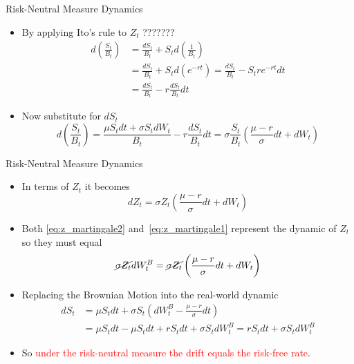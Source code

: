 \documentclass{beamer}
\begin{document}
\begin{frame}{Risk-Neutral Measure Dynamics}
\begin{itemize}
	\item By applying Ito's rule to $Z_t$ ???????
	\begin{equation*}
		\begin{aligned}
		d\left(\frac{S_t}{B_t}\right) &= \frac{dS_t}{B_t} + S_t d\left(\frac{1}{B_t}\right) \\ 
		&=\frac{dS_t}{B_t} + S_t d\left(e^{-rt}\right) = \frac{dS_t}{B_t} - S_t re^{-rt}dt \\
		&= \frac{dS_t}{B_t} - r\frac{dS_t}{B_t}dt 
		\end{aligned}
	\end{equation*}
	\item Now substitute for $dS_t$
	\begin{equation*}
		d\left(\frac{S_t}{B_t}\right)= \frac{ \mu S_t dt + \sigma S_t dW_t}{B_t} - r\frac{dS_t}{B_t}dt = \sigma\frac{S_t}{B_t}\left(\frac{\mu - r}{\sigma}dt + dW_t \right)
	\end{equation*}	
\end{itemize}
\end{frame}

\begin{frame}{Risk-Neutral Measure Dynamics}
	\begin{itemize}
	\item In terms of $Z_t$ it becomes
	\begin{equation}
	dZ_t = \sigma Z_t\left(\frac{\mu - r}{\sigma}dt + dW_t \right)
	\label{eq:z_martingale2}
	\end{equation}
	\item Both \cref{eq:z_martingale2} and~\cref{eq:z_martingale1} represent the dynamic of $Z_t$ so they must equal
	\begin{equation*}
		\cancel{\sigma Z_t}dW_t^B = \cancel{\sigma Z_t}\left(\frac{\mu - r}{\sigma}dt + dW_t\right)
	\end{equation*}
	\item Replacing the Brownian Motion into the real-world dynamic
	\begin{equation*}
		\begin{aligned}
		dS_t &= \mu S_t dt + \sigma S_t \left(dW_t^B - \frac{\mu - r}{\sigma}dt\right) \\
		& = \mu S_t dt - \mu S_t dt + rS_t dt + \sigma S_t dW_t^B  = rS_t dt + \sigma S_t dW_t^B
		\end{aligned}
	\end{equation*}
	\item So \textcolor{red}{under the risk-neutral measure the drift equals the risk-free rate}.
\end{itemize}
\end{frame}
\end{document}
